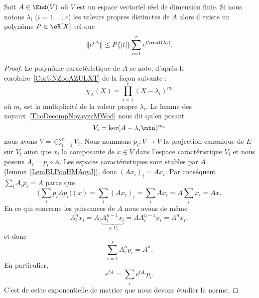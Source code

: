 \begin{lemma}   \label{LemQEARooLRXEef}
	Soit \( A\in\End(V)\) où \( V\) est un espace vectoriel réel de dimension finie. Si nous notons \( \lambda_i\) (\( i=1,\ldots, r\)) les valeurs propres distinctes de \( A\) alors il existe un polynôme \( P\in \eR[X]\) tel que
	\begin{equation}
		\|  e^{tA} \|\leq P\big( | t | \big)\sum_{i=1}^r e^{t\real(\lambda_i)}.
	\end{equation}
\end{lemma}

\begin{proof}
	Le polynôme caractéristique de \( A\) se note, d'après le corolaire~\ref{CorUNZooAZULXT} de la façon suivante :
	\begin{equation}
		\chi_A(X)=\prod_{i=1}^r(X-\lambda_i)^{m_i}
	\end{equation}
	où \( m_i\) est la multiplicité de la valeur propre \( \lambda_i\). Le lemme des noyaux~\ref{ThoDecompNoyayzzMWod} nous dit qu'en posant
	\begin{equation}
		V_i=\ker(A-\lambda_i\mtu)^{m_i}
	\end{equation}
	nous avons \( V=\bigoplus_{i=1}^rV_i\). Nous nommons \( p_i\colon V\to V\) la projection canonique de \( E\) sur \( V_i\) ainsi que \( x_i\) la composante de \( x\in V\) dans l'espace caractéristique \( V_i\) et nous posons \( A_i=p_i\circ A\). Les espaces caractéristiques sont stables par \( A\) (lemme~\ref{LemBLPooHMAoyJ}), donc \( (Ax_i)_i=Ax_i\). Par conséquent \( \sum_i A_ip_i=A\) parce que
	\begin{equation}
		\big( \sum_ip_iAp_i \big)(x)=\sum_i(Ax_i)_i=\sum_iAx_i=A\sum_ix_i=Ax.
	\end{equation}
	En ce qui concerne les puissances de \( A\) nous avons de même
	\begin{equation}
		A_i^nx_i=A_i\underbrace{A_i^{n-1}x_i}_{\in V_i}=AA_i^{n-1}x_i=A^nx_i,
	\end{equation}
	et donc
	\begin{equation}
		\sum_{i=1}^rA_i^np_i=A^n.
	\end{equation}
	En particulier,
	\begin{equation}    \label{EqPVIooGxwFBH}
		e^{tA}=\sum_i e^{tA_i}p_i.
	\end{equation}
	C'est de cette exponentielle de matrice que nous devons étudier la norme.


\end{proof}
